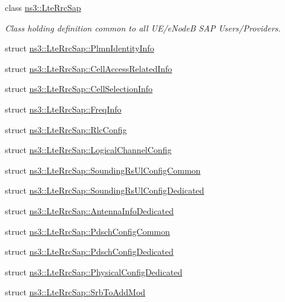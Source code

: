 \begin{DoxyCompactItemize}
\item 
class \hyperlink{classns3_1_1LteRrcSap}{ns3\+::\+Lte\+Rrc\+Sap}
\begin{DoxyCompactList}\small\item\em Class holding definition common to all U\+E/e\+NodeB S\+AP Users/\+Providers. \end{DoxyCompactList}\item 
struct \hyperlink{structns3_1_1LteRrcSap_1_1PlmnIdentityInfo}{ns3\+::\+Lte\+Rrc\+Sap\+::\+Plmn\+Identity\+Info}
\item 
struct \hyperlink{structns3_1_1LteRrcSap_1_1CellAccessRelatedInfo}{ns3\+::\+Lte\+Rrc\+Sap\+::\+Cell\+Access\+Related\+Info}
\item 
struct \hyperlink{structns3_1_1LteRrcSap_1_1CellSelectionInfo}{ns3\+::\+Lte\+Rrc\+Sap\+::\+Cell\+Selection\+Info}
\item 
struct \hyperlink{structns3_1_1LteRrcSap_1_1FreqInfo}{ns3\+::\+Lte\+Rrc\+Sap\+::\+Freq\+Info}
\item 
struct \hyperlink{structns3_1_1LteRrcSap_1_1RlcConfig}{ns3\+::\+Lte\+Rrc\+Sap\+::\+Rlc\+Config}
\item 
struct \hyperlink{structns3_1_1LteRrcSap_1_1LogicalChannelConfig}{ns3\+::\+Lte\+Rrc\+Sap\+::\+Logical\+Channel\+Config}
\item 
struct \hyperlink{structns3_1_1LteRrcSap_1_1SoundingRsUlConfigCommon}{ns3\+::\+Lte\+Rrc\+Sap\+::\+Sounding\+Rs\+Ul\+Config\+Common}
\item 
struct \hyperlink{structns3_1_1LteRrcSap_1_1SoundingRsUlConfigDedicated}{ns3\+::\+Lte\+Rrc\+Sap\+::\+Sounding\+Rs\+Ul\+Config\+Dedicated}
\item 
struct \hyperlink{structns3_1_1LteRrcSap_1_1AntennaInfoDedicated}{ns3\+::\+Lte\+Rrc\+Sap\+::\+Antenna\+Info\+Dedicated}
\item 
struct \hyperlink{structns3_1_1LteRrcSap_1_1PdschConfigCommon}{ns3\+::\+Lte\+Rrc\+Sap\+::\+Pdsch\+Config\+Common}
\item 
struct \hyperlink{structns3_1_1LteRrcSap_1_1PdschConfigDedicated}{ns3\+::\+Lte\+Rrc\+Sap\+::\+Pdsch\+Config\+Dedicated}
\item 
struct \hyperlink{structns3_1_1LteRrcSap_1_1PhysicalConfigDedicated}{ns3\+::\+Lte\+Rrc\+Sap\+::\+Physical\+Config\+Dedicated}
\item 
struct \hyperlink{structns3_1_1LteRrcSap_1_1SrbToAddMod}{ns3\+::\+Lte\+Rrc\+Sap\+::\+Srb\+To\+Add\+Mod}
\item 

\end{DoxyCompactItemize}
